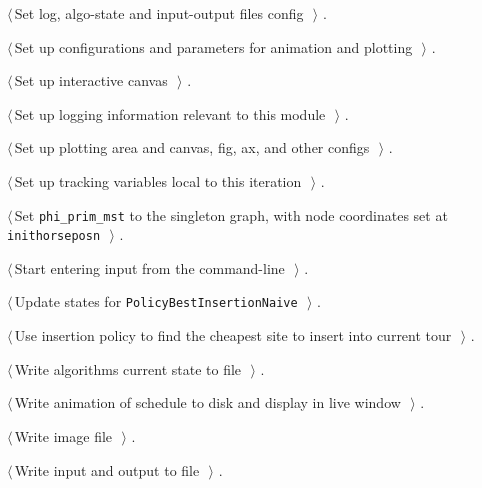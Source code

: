 \documentclass[11.5pt]{report}
\begin{document}
{\begin{list}{}{\setlength{\itemsep}{-\parsep}\setlength{\itemindent}{-\leftmargin}}
\item $\langle\,$Set log, algo-state and input-output files config\nobreak\ {\footnotesize {}}$\,\rangle$ {\footnotesize {\NWtxtRefIn} .}
\item $\langle\,$Set up configurations and parameters for animation and plotting\nobreak\ {\footnotesize {}}$\,\rangle$ {\footnotesize {\NWtxtRefIn} .}
\item $\langle\,$Set up interactive canvas\nobreak\ {\footnotesize {}}$\,\rangle$ {\footnotesize {\NWtxtRefIn} .}
\item $\langle\,$Set up logging information relevant to this module\nobreak\ {\footnotesize {}}$\,\rangle$ {\footnotesize {\NWtxtRefIn} .}
\item $\langle\,$Set up plotting area and canvas, fig, ax, and other configs\nobreak\ {\footnotesize {}}$\,\rangle$ {\footnotesize {\NWtxtRefIn} .}
\item $\langle\,$Set up tracking variables local to this iteration\nobreak\ {\footnotesize {}}$\,\rangle$ {\footnotesize {\NWtxtRefIn} .}
\item $\langle\,$Set \verb|phi_prim_mst| to the singleton graph, with node coordinates set at \verb|inithorseposn|\nobreak\ {\footnotesize {}}$\,\rangle$ {\footnotesize {\NWtxtRefIn} .}
\item $\langle\,$Start entering input from the command-line\nobreak\ {\footnotesize {}}$\,\rangle$ {\footnotesize {\NWtxtRefIn} .}
\item $\langle\,$Update states for \texttt{PolicyBestInsertionNaive}\nobreak\ {\footnotesize {}}$\,\rangle$ {\footnotesize {\NWtxtRefIn} .}
\item $\langle\,$Use insertion policy to find the cheapest site to insert into current tour\nobreak\ {\footnotesize {}}$\,\rangle$ {\footnotesize {\NWtxtRefIn} .}
\item $\langle\,$Write algorithms current state to file\nobreak\ {\footnotesize {}}$\,\rangle$ {\footnotesize {\NWtxtRefIn} .}
\item $\langle\,$Write animation of schedule to disk and display in live window\nobreak\ {\footnotesize {}}$\,\rangle$ {\footnotesize {\NWtxtRefIn} .}
\item $\langle\,$Write image file\nobreak\ {\footnotesize {}}$\,\rangle$ {\footnotesize {\NWtxtRefIn} .}
\item $\langle\,$Write input and output to file\nobreak\ {\footnotesize {}}$\,\rangle$ {\footnotesize {\NWtxtRefIn} .}
\end{list}}
\end{document}
